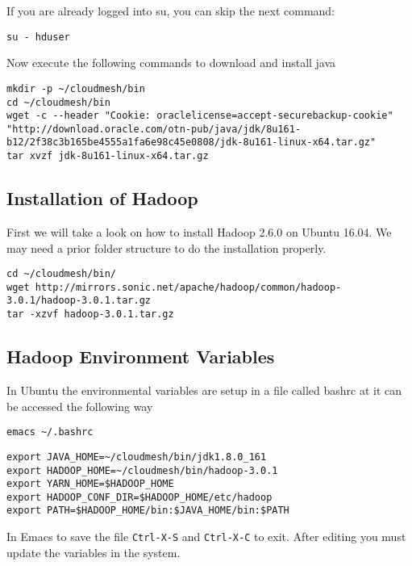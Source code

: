 If you are already logged into su, you can skip the next command:

\begin{lstlisting}
su - hduser
\end{lstlisting}

Now execute the following commands to download and install java

\begin{lstlisting}
mkdir -p ~/cloudmesh/bin
cd ~/cloudmesh/bin
wget -c --header "Cookie: oraclelicense=accept-securebackup-cookie" "http://download.oracle.com/otn-pub/java/jdk/8u161-b12/2f38c3b165be4555a1fa6e98c45e0808/jdk-8u161-linux-x64.tar.gz"
tar xvzf jdk-8u161-linux-x64.tar.gz
\end{lstlisting}

\subsection{Installation of Hadoop}\label{installation-of-hadoop}

First we will take a look on how to install Hadoop 2.6.0 on Ubuntu
16.04. We may need a prior folder structure to do the installation
properly.

\begin{lstlisting}
cd ~/cloudmesh/bin/
wget http://mirrors.sonic.net/apache/hadoop/common/hadoop-3.0.1/hadoop-3.0.1.tar.gz
tar -xzvf hadoop-3.0.1.tar.gz
\end{lstlisting}

\subsection{Hadoop Environment Variables}

In Ubuntu the environmental variables are setup in a file called bashrc
at it can be accessed the following way

\begin{lstlisting}
emacs ~/.bashrc
\end{lstlisting}

\begin{lstlisting}
export JAVA_HOME=~/cloudmesh/bin/jdk1.8.0_161
export HADOOP_HOME=~/cloudmesh/bin/hadoop-3.0.1
export YARN_HOME=$HADOOP_HOME
export HADOOP_CONF_DIR=$HADOOP_HOME/etc/hadoop
export PATH=$HADOOP_HOME/bin:$JAVA_HOME/bin:$PATH
\end{lstlisting}

In Emacs to save the file \verb|Ctrl-X-S| and \verb|Ctrl-X-C| to exit. After editing
you must update the variables in the system.

